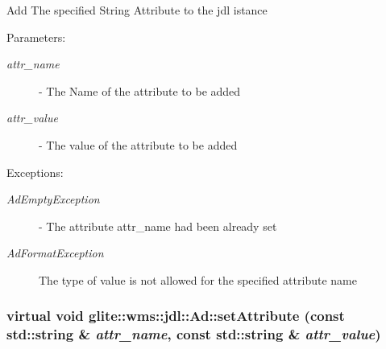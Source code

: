 Add The specified String Attribute to the jdl istance \begin{Desc}
\item[Parameters:]
\begin{description}
\item[{\em attr\_\-name}]- The Name of the attribute to be added \item[{\em attr\_\-value}]- The value of the attribute to be added \end{description}
\end{Desc}
\begin{Desc}
\item[Exceptions:]
\begin{description}
\item[{\em Ad\-Empty\-Exception}]- The attribute attr\_\-name had been already set \item[{\em Ad\-Format\-Exception}]The type of value is not allowed for the specified attribute name \end{description}
\end{Desc}
\hypertarget{classglite_1_1wms_1_1jdl_1_1Ad_z19_10}{
\subsubsection[setAttribute]{\setlength{\rightskip}{0pt plus 5cm}virtual void glite::wms::jdl::Ad::set\-Attribute (const std::string \& {\em attr\_\-name}, const std::string \& {\em attr\_\-value})}}
\label{classglite_1_1wms_1_1jdl_1_1Ad_z19_10}


